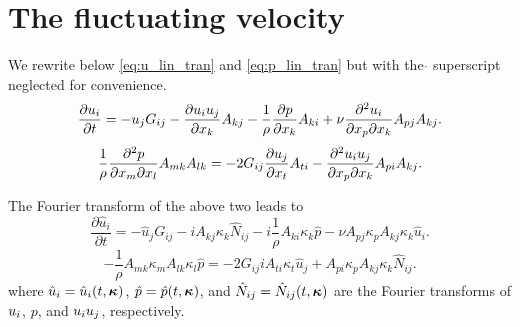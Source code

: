 \documentclass[oneside,a4paper,11pt]{report}
\begin{document}
\section{The fluctuating velocity}
We rewrite below \cref{eq:u_lin_tran} and \cref{eq:p_lin_tran} but with the $\mathring{}$ superscript neglected for convenience. 
\begin{equation}
\frac{\partial u_i }{\partial t } = -u_j G_{ij} - \frac{\partial u_i u_j}{\partial x_k} A_{kj} - \frac{1}{\rho} \frac{\partial p }{\partial x_k} A_{ki} + \nu \frac{ \partial^2 u_i}{\partial x_p \partial x_k} A_{pj} A_{kj}.
\end{equation}
\begin{equation}
\frac{1}{\rho} \frac{\partial^2 p }{\partial x_m \partial x_l} A_{mk} A_{lk} = -2 G_{ij} \frac{\partial u_j }{\partial x_t} A_{ti} - \frac{\partial^2 u_i u_j}{\partial x_p \partial x_k} A_{pi}A_{kj}.
\end{equation}

The Fourier transform of the above two leads to
\begin{equation}
\frac{\partial \hat{u}_i }{\partial t } = -\hat{u}_j G_{ij} - i A_{kj}\kappa_k  \hat{N}_{ij} - i\frac{1}{\rho} A_{ki} \kappa_k  \hat{ p } - \nu  A_{pj}\kappa_p A_{kj}\kappa_k \hat{u}_i.
\end{equation}
\begin{equation}
-\frac{1}{\rho} A_{mk}\kappa_m A_{lk}\kappa_l \hat{ p } = -2 G_{ij} i A_{ti}\kappa_t \hat{u}_j + A_{pi}\kappa_p A_{kj}\kappa_k \hat{N}_{ij}.
\end{equation}
where $\hat{u}_i = \hat{u}_i(t,\boldsymbol\kappa)$, $\hat{p} = \hat{p}(t,\boldsymbol\kappa)$, and $\hat{N}_{ij} = \hat{N}_{ij}(t,\boldsymbol\kappa)$ are the Fourier transforms of $u_i$, $p$, and $u_i u_j$, respectively. 
\end{document}
